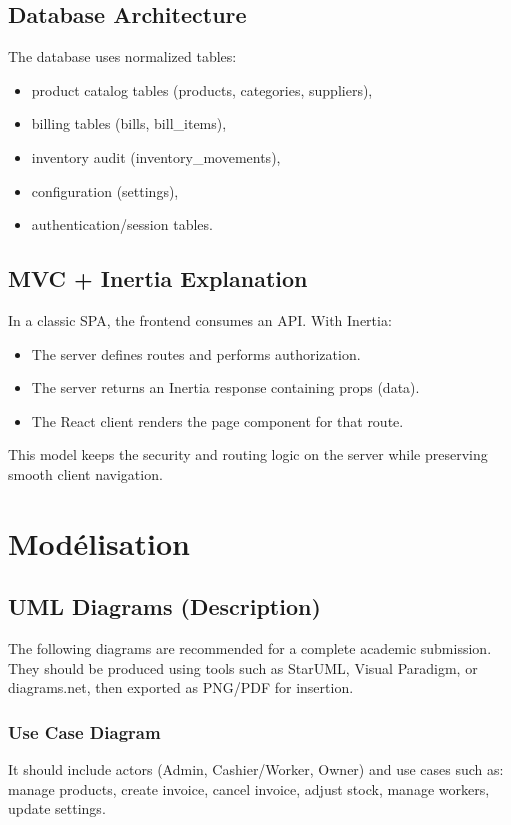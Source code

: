 \documentclass[12pt,a4paper]{report}
\begin{document}
\section{Database Architecture}
The database uses normalized tables:
\begin{itemize}
  \item product catalog tables (products, categories, suppliers),
  \item billing tables (bills, bill\_items),
  \item inventory audit (inventory\_movements),
  \item configuration (settings),
  \item authentication/session tables.
\end{itemize}

\section{MVC + Inertia Explanation}
In a classic SPA, the frontend consumes an API. With Inertia:
\begin{itemize}
  \item The server defines routes and performs authorization.
  \item The server returns an Inertia response containing props (data).
  \item The React client renders the page component for that route.
\end{itemize}
This model keeps the security and routing logic on the server while preserving smooth client navigation.

\chapter{Modélisation}

\section{UML Diagrams (Description)}
The following diagrams are recommended for a complete academic submission. They should be produced using tools such as StarUML, Visual Paradigm, or diagrams.net, then exported as PNG/PDF for insertion.

\subsection{Use Case Diagram}
It should include actors (Admin, Cashier/Worker, Owner) and use cases such as: manage products, create invoice, cancel invoice, adjust stock, manage workers, update settings.
\end{document}
